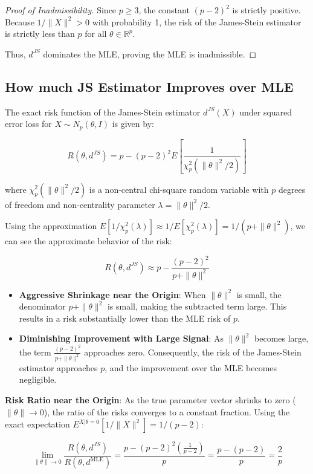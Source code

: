 \documentclass[
  letterpaper,
  DIV=11,
  numbers=noendperiod]{scrreprt}
\renewcommand{\[}{\begin{equation}}
\renewcommand{\]}{\end{equation}}
\theoremstyle{definition}
\theoremstyle{plain}
\theoremstyle{plain}
\theoremstyle{plain}
\theoremstyle{definition}
\theoremstyle{plain}
\theoremstyle{remark}
\begin{document}
\begin{proof}[Proof of Inadmissibility]
Since \(p \ge 3\), the constant \((p-2)^2\) is strictly positive.
Because \(1/\lVert X \rVert^2 > 0\) with probability 1, the risk of the
James-Stein estimator is strictly less than \(p\) for all
\(\theta \in \mathbb{R}^p\).

Thus, \(d^{JS}\) dominates the MLE, proving the MLE is inadmissible.
\end{proof}

\subsection{How much JS Estimator Improves over
MLE}\label{how-much-js-estimator-improves-over-mle}

The exact risk function of the James-Stein estimator \(d^{JS}(X)\) under
squared error loss for \(X \sim N_p(\theta, I)\) is given by:

\[R(\theta, d^{JS}) = p - (p-2)^2 E \left[ \frac{1}{\chi_p^2(\|\theta\|^2/2)} \right]\]

where \(\chi_p^2(\|\theta\|^2/2)\) is a non-central chi-square random
variable with \(p\) degrees of freedom and non-centrality parameter
\(\lambda = \|\theta\|^2/2\).

Using the approximation
\(E[1/\chi_p^2(\lambda)] \approx 1/E[\chi_p^2(\lambda)] = 1/(p + \|\theta\|^2)\),
we can see the approximate behavior of the risk:

\[R(\theta, d^{JS}) \approx p - \frac{(p-2)^2}{p + \|\theta\|^2}\]

\begin{itemize}
\item
  \textbf{Aggressive Shrinkage near the Origin}: When \(\|\theta\|^2\)
  is small, the denominator \(p + \|\theta\|^2\) is small, making the
  subtracted term large. This results in a risk substantially lower than
  the MLE risk of \(p\).
\item
  \textbf{Diminishing Improvement with Large Signal}: As
  \(\|\theta\|^2\) becomes large, the term
  \(\frac{(p-2)^2}{p + \|\theta\|^2}\) approaches zero. Consequently,
  the risk of the James-Stein estimator approaches \(p\), and the
  improvement over the MLE becomes negligible.
\end{itemize}

\textbf{Risk Ratio near the Origin}: As the true parameter vector
shrinks to zero (\(\|\theta\| \to 0\)), the ratio of the risks converges
to a constant fraction. Using the exact expectation
\(E^{X|\theta=0}[1/\|X\|^2] = 1/(p-2)\):

\[
\lim_{\|\theta\| \to 0} \frac{R(\theta, d^{JS})}{R(\theta, d^{\text{MLE}})} = \frac{p - (p-2)^2 \left( \frac{1}{p-2} \right)}{p} = \frac{p - (p-2)}{p} = \frac{2}{p}
\]
\end{document}
